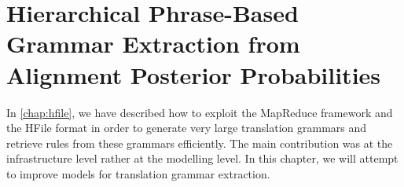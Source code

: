 \chapter{Hierarchical Phrase-Based Grammar Extraction from Alignment Posterior Probabilities}
\label{chap:extractionFromPosteriors}


In \autoref{chap:hfile}, we have described how to exploit the MapReduce
framework and the HFile format in order to generate very large
translation grammars
and retrieve rules from these grammars efficiently. The main contribution
was at the infrastructure level rather at the modelling level. In this chapter,
we will attempt to improve models for translation grammar extraction.

